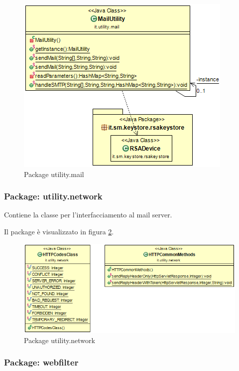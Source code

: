 \begin{figure}[!htbp]
	\centering
	\includegraphics[scale = .5]{img/dependencies_utility_mail}
	\caption{Package utility.mail}
	\label{gfx:dependencies_utilitymail}
\end{figure}

\subsubsection{Package: \textbf{utility.network}}

Contiene la classe per l’interfacciamento al mail server.

Il package è visualizzato in figura \ref{gfx:dependencies_utility_network}.

\begin{figure}[!htbp]
	\centering
	\includegraphics[scale = .5]{img/dependencies_utility_network}
	\caption{Package utility.network}
	\label{gfx:dependencies_utility_network}
\end{figure}

\subsubsection{Package: \textbf{webfilter}}

